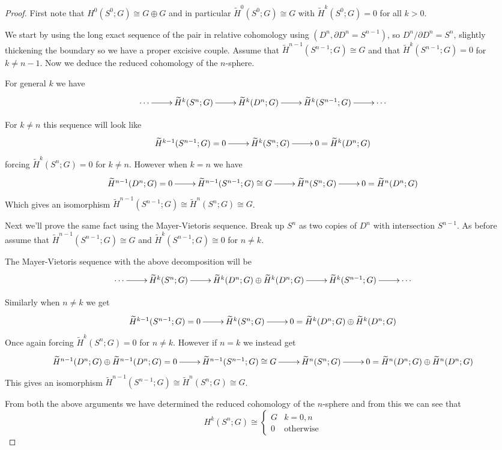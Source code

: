 \documentclass[10pt]{article}
\newcommand{\sk}{\vskip 10mm}
\newcommand{\rH}{\widetilde{H}}
\theoremstyle{plain}
\theoremstyle{remark}
\begin{document}
\begin{proof}
  First note that $H^0(S^0;G)\cong G\oplus G$ and in particular $\rH^0(S^0;G)\cong G$ with
  $\rH^k(S^0;G)=0$ for all $k>0$.
  
  We start by using the long exact sequence of the pair in relative
  cohomology using $(D^n,\partial D^n=S^{n-1})$, so $D^n/\partial D^n=S^n$,  slightly thickening
  the boundary so we have a proper excisive couple. Assume that
  $\rH^{n-1}(S^{n-1};G)\cong G$ and that $\rH^k(S^{n-1};G)=0$ for $k\neq n-1$. Now we
  deduce the reduced cohomology of the $n$-sphere.

  For general $k$ we have
  \[
    \xymatrix{
      \cdots \ar[r] & \rH^k(S^n;G)\ar[r] & \rH^k(D^n;G)\ar[r] & \rH^k(S^{n-1};G) \ar[r] & \cdots      
    }
  \]

  For $k\neq n$ this sequence will look like
  \[
    \xymatrix{
      \rH^{k-1}(S^{n-1};G)=0 \ar[r] & \rH^k(S^n;G) \ar[r] & 0=\rH^k(D^n;G)
    }
  \]
  forcing $\rH^k(S^n;G)= 0$ for $k\neq n$. However when $k=n$ we have
  \[
    \xymatrix{
      \rH^{n-1}(D^n;G)=0\ar[r] & \rH^{n-1}(S^{n-1};G)\cong G \ar[r] & \rH^n(S^n;G) \ar[r] & 0=\rH^n(D^n;G)
    }
  \]
  Which gives an isomorphism $\rH^{n-1}(S^{n-1};G)\cong\rH^n(S^n;G)\cong G$.

  \sk

  Next we'll prove the same fact using the Mayer-Vietoris sequence. Break
  up $S^n$ as two copies of $D^n$ with intersection $S^{n-1}$. As before
  assume that $\rH^{n-1}(S^{n-1};G)\cong G$ and $\rH^k(S^{n-1};G)\cong 0$ for $n\neq k$.

  The Mayer-Vietoris sequence with the above decomposition will be
  \[
    \xymatrix{
      \cdots \ar[r] & \rH^k(S^n;G) \ar[r] & \rH^k(D^n;G)\oplus\rH^k(D^n;G) \ar[r] & \rH^k(S^{n-1};G) \ar[r] & \cdots
    }
  \]

  Similarly when $n\neq k$ we get
  \[
    \xymatrix{
      \rH^{k-1}(S^{n-1};G)=0 \ar[r] & \rH^k(S^n;G) \ar[r] & 0=\rH^k(D^n;G)\oplus\rH^k(D^n;G)
    }
  \]
  Once again forcing $\rH^k(S^n;G)=0$ for $n\neq k$. However if $n=k$ we instead get
  \[
    \xymatrix{
     \rH^{n-1}(D^n;G)\oplus\rH^{n-1}(D^n;G)=0 \ar[r] & \rH^{n-1}(S^{n-1};G)\cong G \ar[r] & \rH^n(S^n;G) \ar[r] & 0=\rH^{n}(D^n;G)\oplus\rH^{n}(D^n;G)
    }
  \]
  This gives an isomorphism $\rH^{n-1}(S^{n-1};G)\cong\rH^n(S^n;G)\cong G$.

  From both the above arguments we have determined the reduced cohomology
  of the $n$-sphere and from this we can see that
  \[
    H^k(S^n;G)\cong 
    \left\{
      \begin{array}{lr}
        G& k=0,n\\
        0& \text{otherwise}
      \end{array}
    \right.
  \]
\end{proof}
\end{document}

